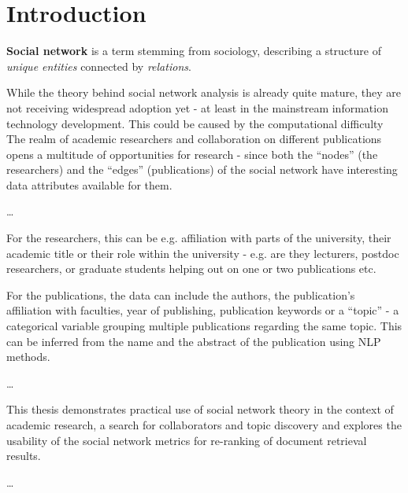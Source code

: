 \chapter*{Introduction}

\textbf{Social network} is a term stemming from sociology, describing a structure of \textit{unique entities} connected by \textit{relations}. 

While the theory behind social network analysis is already quite mature, they are not receiving widespread adoption yet - at least in the mainstream information technology development. 
This could be caused by the computational difficulty 
The realm of academic researchers and collaboration on different publications opens a multitude of opportunities for research - since both the ``nodes'' (the researchers) and the ``edges'' (publications) of the social network have interesting data attributes available for them. 

\dots

For the researchers, this can be e.g. affiliation with parts of the university, their academic title or their role within the university - e.g. are they lecturers, postdoc researchers, or graduate students helping out on one or two publications etc.

For the publications, the data can include the authors, the publication's affiliation with faculties, year of publishing, publication keywords or a ``topic'' - a categorical variable grouping multiple publications regarding the same topic. This can be inferred from the name and the abstract of the publication using NLP methods.

\dots

This thesis demonstrates practical use of social network theory in the context of academic research, a search for collaborators and topic discovery and explores the usability of the social network metrics for re-ranking of document retrieval results.

\dots